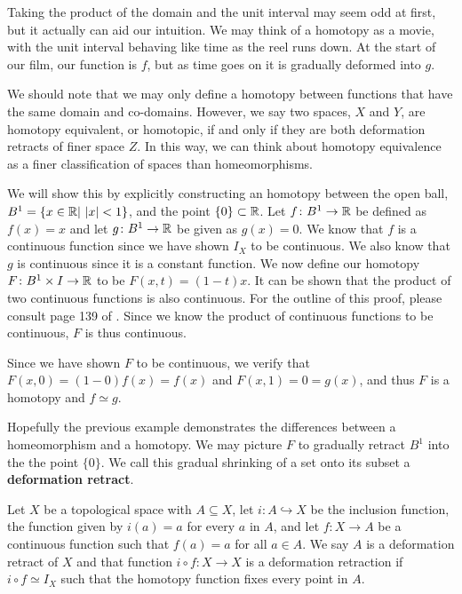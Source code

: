 Taking the product of the domain and the unit interval may seem odd at first, but it actually can aid our intuition. We may think of a homotopy as a movie, with the unit interval behaving like time as the reel runs down. At the start of our film, our function is $f$, but as time goes on it is gradually deformed into $g$. 

We should note that we may only define a homotopy between functions that have the same domain and co-domains. However, we say two spaces, $X$ and $Y$, are homotopy equivalent, or homotopic, if and only if they are both deformation retracts of finer space $Z$. In this way, we can think about homotopy equivalence as a finer classification of spaces than homeomorphisms. 

We will show this by explicitly constructing an homotopy between the open ball, $B^1 =\{x \in \mathbb{R}| \text{ }|x| <1\}$, and the point $\{0\}\subset \mathbb{R}$. Let $f\colon B^1 \rightarrow \mathbb{R}$ be defined as $f(x)=x$ and let $g\colon B^1 \rightarrow \mathbb{R}$ be given as $g(x)=0$. We know that $f$ is a continuous function since we have shown $I_X$ to be continuous. We also know that $g$ is continuous since it is a constant function. We now define our homotopy $F\colon B^1 \times I \rightarrow \mathbb{R}$ to be $F(x,t)= (1-t)x$. It can be shown that the product of two continuous functions is also continuous. For the outline of this proof, please consult page 139 of \cite{top}. Since we know the product of continuous functions to be continuous, $F$ is thus continuous. 

Since we have shown $F$ to be continuous, we verify that $F(x,0)= (1-0)f(x) = f(x)$ and $F(x,1)= 0 =g(x)$, and thus $F$ is a homotopy and $f\simeq g$.  

Hopefully the previous example demonstrates the differences between a homeomorphism and a homotopy. We may picture $F$ to gradually retract $B^1$ into the the point $\{0\}$. We call this gradual shrinking of a set onto its subset a \textbf{deformation retract}.

\begin{defn}
Let $X$ be a topological space with $A\subseteq X$, let $i\colon A\hookrightarrow X$ be the inclusion function, the function given by $i(a)=a$ for every $a$ in $A$, and let $f\colon X\rightarrow A$ be a continuous function such that $f(a)= a$ for all $a\in A$. We say $A$ is a deformation retract of $X$ and that function $i\circ f\colon X\rightarrow X$ is a deformation retraction if $i\circ f \simeq I_X$ such that the homotopy function fixes every point in $A$.
\end{defn}

